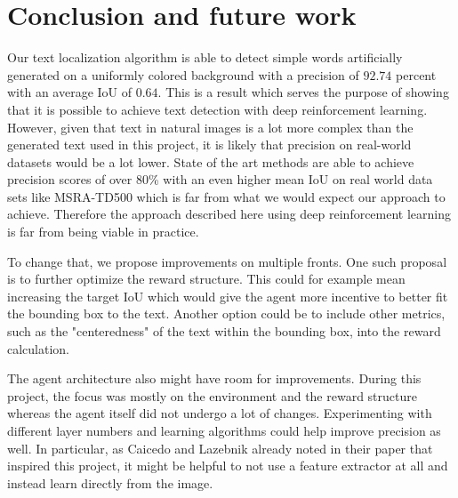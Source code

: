 \section{Conclusion and future work}
Our text localization algorithm is able to detect simple words artificially generated on a uniformly colored background with a  precision of $92.74$ percent with an average IoU of $0.64$.
This is a result which serves the purpose of showing that it is possible to achieve text detection with deep reinforcement learning.
However, given that text in natural images is a lot more complex than the generated text used in this project, it is likely that precision on real-world datasets would be a lot lower.
State of the art methods are able to achieve precision scores of over 80\% with an even higher mean IoU on real world data sets like MSRA-TD500 \cite{DBLP:journals/corr/ZhouYWWZHL17} which is far from what we would expect our approach to achieve. Therefore the approach described here using deep reinforcement learning is far from being viable in practice. 

To change that, we propose improvements on multiple fronts. One such proposal is to further optimize the reward structure. This could for example mean increasing the target IoU which would give the agent more incentive to better fit the bounding box to the text. Another option could be to include other metrics, such as the "centeredness" of the text within the bounding box, into the reward calculation. 

The agent architecture also might have room for improvements. During this project, the focus was mostly on the environment and the reward structure whereas the agent itself did not undergo a lot of changes. Experimenting with different layer numbers and learning algorithms could help improve precision as well. In particular, as Caicedo and Lazebnik \cite{caicedo2015active} already noted in their paper that inspired this project, it might be helpful to not use a feature extractor at all and instead learn directly from the image.